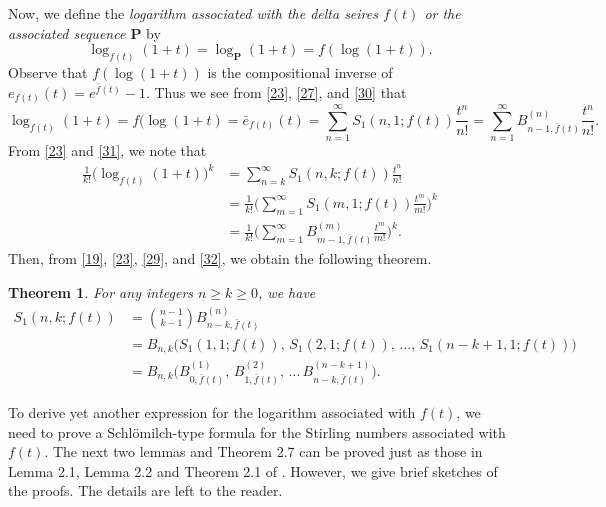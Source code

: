 \documentclass[a4paper,11pt]{amsart}
\newtheorem{theorem}{Theorem}[section]
\begin{document}
Now, we define the {\it{logarithm associated with the delta seires $f(t)$ or the associated sequence $\mathbf{P}$}} by
\begin{equation} \label{30}
\log_{f(t)}(1+t)=\log_{\mathbf{P}}(1+t)= f(\log(1+t)).
\end{equation}
Observe that $f(\log(1+t))$ is the compositional inverse of $e_{f(t)}(t)=e^{\bar{f}(t)}-1$.
Thus we see from \eqref{23}, \eqref{27}, and \eqref{30} that 
\begin{equation} \label{31}
\log_{f(t)}(1+t)=f(\log(1+t)=\bar{e}_{f(t)}(t)=\sum_{n=1}^{\infty}S_{1}(n,1; f(t))\frac{t^{n}}{n!}=\sum_{n=1}^{\infty}B_{n-1,\bar{f}(t)}^{(n)}\frac{t^{n}}{n!}.
\end{equation}
From \eqref{23} and \eqref{31}, we note that
\begin{equation} \label{32}
\begin{aligned}
\frac{1}{k!}\big(\log_{f(t)}(1+t)\big)^{k}&=\sum_{n=k}^{\infty}S_{1}(n,k; f(t))\frac{t^{n}}{n!}\\
&=\frac{1}{k!}\bigg(\sum_{m=1}^{\infty}S_{1}(m,1; f(t))\frac{t^{m}}{m!}\bigg)^{k}\\
&=\frac{1}{k!}\bigg(\sum_{m=1}^{\infty}B_{m-1,\bar{f}(t)}^{(m)} \frac{t^{m}}{m!}\bigg)^{k}.
\end{aligned}
\end{equation}
Then, from \eqref{19}, \eqref{23}, \eqref{29}, and \eqref{32}, we obtain the following theorem.
\begin{theorem}
For any integers $n \ge k \ge 0$, we have
\begin{align*}
S_{1}(n,k; f(t))&=\binom{n-1}{k-1}B_{n-k,\bar{f}(t)}^{(n)} \\
&=B_{n,k}\big(S_{1}(1,1; f(t)),\,S_{1}(2,1; f(t)),\,\dots,\,S_{1}(n-k+1,1; f(t))\big) \\
&=B_{n,k}\Big(B_{0,\bar{f}(t)}^{(1)},\,B_{1,\bar{f}(t)}^{(2)},\,\dots\,B_{n-k,\bar{f}(t)}^{(n-k+1)}\Big).
\end{align*}
\end{theorem}
To derive yet another expression for the logarithm associated with $f(t)$, we need to prove a Schl\"omilch-type formula for the Stirling numbers associated with $f(t)$.
The next two lemmas and Theorem 2.7 can be proved just as those in Lemma 2.1, Lemma 2.2 and Theorem 2.1 of \cite{28}. However, we give brief sketches of the proofs. The details are left to the reader.
\end{document}
